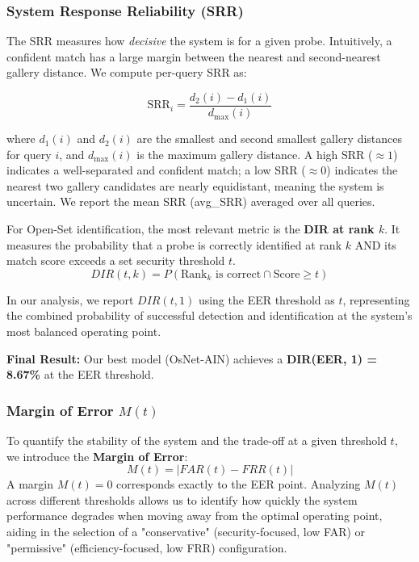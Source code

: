 \documentclass[10pt,twocolumn,letterpaper]{article}
\begin{document}
\subsubsection{System Response Reliability (SRR)}
The SRR measures how \textit{decisive} the system is for a given probe. Intuitively, a confident match has a large margin between the nearest and second-nearest gallery distance. We compute per-query SRR as:

\begin{equation}
    \text{SRR}_i = \frac{d_2(i) - d_1(i)}{d_{\max}(i)}
\end{equation}

where $d_1(i)$ and $d_2(i)$ are the smallest and second smallest gallery distances for query $i$, and $d_{\max}(i)$ is the maximum gallery distance. A high SRR ($\approx 1$) indicates a well-separated and confident match; a low SRR ($\approx 0$) indicates the nearest two gallery candidates are nearly equidistant, meaning the system is uncertain. We report the mean SRR (avg\_SRR) averaged over all queries.

For Open-Set identification, the most relevant metric is the \textbf{DIR at rank $k$}. It measures the probability that a probe is correctly identified at rank $k$ AND its match score exceeds a set security threshold $t$.
\begin{equation}
    DIR(t, k) = P(\text{Rank}_k \text{ is correct} \cap \text{Score} \geq t)
\end{equation}

In our analysis, we report $DIR(t, 1)$ using the EER threshold as $t$, representing the combined probability of successful detection and identification at the system's most balanced operating point.

\textbf{Final Result:} Our best model (OsNet-AIN) achieves a \textbf{DIR(EER, 1) = 8.67\%} at the EER threshold.

\subsubsection{Margin of Error $M(t)$}
To quantify the stability of the system and the trade-off at a given threshold $t$, we introduce the \textbf{Margin of Error}:
\begin{equation}
    M(t) = |FAR(t) - FRR(t)|
\end{equation}
A margin $M(t) = 0$ corresponds exactly to the EER point. Analyzing $M(t)$ across different thresholds allows us to identify how quickly the system performance degrades when moving away from the optimal operating point, aiding in the selection of a "conservative" (security-focused, low FAR) or "permissive" (efficiency-focused, low FRR) configuration.
\end{document}
